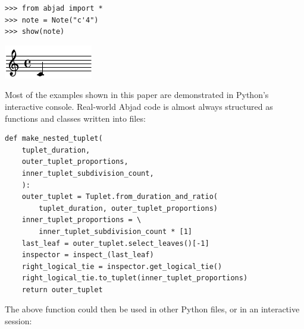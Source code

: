 \documentclass{article}
\begin{document}

\begin{lstlisting}
>>> from abjad import *
>>> note = Note("c'4")
>>> show(note)
\end{lstlisting}
\includegraphics{assets/lilypond-c018a545d264ff34225e9a3a5babb6c1.pdf}

\noindent Most of the examples shown in this paper are demonstrated in Python's
interactive console. Real-world Abjad code is almost always structured as
functions and classes written into files:

\begin{lstlisting}
def make_nested_tuplet(
    tuplet_duration,
    outer_tuplet_proportions,
    inner_tuplet_subdivision_count,
    ):
    outer_tuplet = Tuplet.from_duration_and_ratio(
        tuplet_duration, outer_tuplet_proportions)
    inner_tuplet_proportions = \
        inner_tuplet_subdivision_count * [1]
    last_leaf = outer_tuplet.select_leaves()[-1]
    inspector = inspect_(last_leaf)
    right_logical_tie = inspector.get_logical_tie()
    right_logical_tie.to_tuplet(inner_tuplet_proportions)
    return outer_tuplet
\end{lstlisting}

\noindent The above function could then be used in other Python files, or in an
interactive session:

\end{document}
